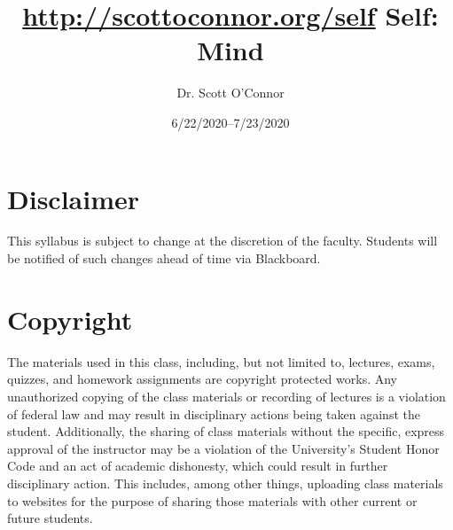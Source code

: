 \documentclass[article,oneside]{memoir}
\def\myauthor{Author}
\def\mytitle{Title}
\def\mycopyright{\myauthor}
\def\myweb{\href{http://scottoconnor.org/self}{http://scottoconnor.org/self}}
\def\myauthor{Dr. Scott O'Connor}
\def\mytitle{{\normalsize \myweb \newline} \HUGE Self: Mind}
\begin{document}
\setsansfont[Mapping=tex-text]{Myriad Pro} 
\setmonofont[Mapping=tex-text,Scale=0.8]{Georgia} 

\def\ind{\hangindent=1 true cm\hangafter=1 \noindent}
\def\labelitemi{$\cdot$}


\title{\LARGE \mytitle}     
\author{\Large\myauthor %
}
\date{6/22/2020--7/23/2020}



\maketitle




%
%


\section{Disclaimer}
 This syllabus is subject to change at the discretion of the faculty. Students will be notified of such changes ahead of time via Blackboard. 


\section{Copyright}
The materials used in this class, including, but not limited to, lectures, exams, quizzes, and homework assignments are copyright protected works.  Any unauthorized copying of the class materials or recording of lectures is a violation of federal law and may result in disciplinary actions being taken against the student.  Additionally, the sharing of class materials without the specific, express approval of the instructor may be a violation of the University's Student Honor Code and an act of academic dishonesty, which could result in further disciplinary action.  This includes, among other things, uploading class materials to websites for the purpose of sharing those materials with other current or future students. 
\end{document}
